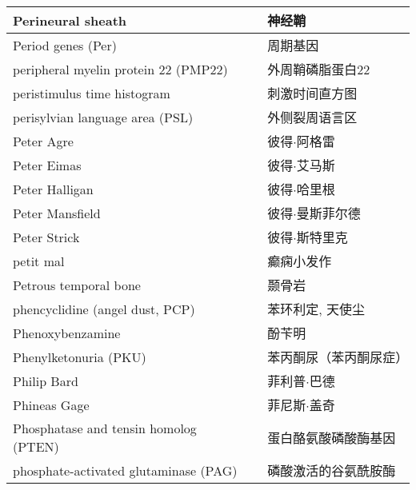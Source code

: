 \begin{longtable}{lll}
	\midrule
	Perineural sheath     && 神经鞘   \\
	
	\midrule
	Period genes (Per)    && 周期基因   \\
	
	\midrule
	peripheral myelin protein 22  (PMP22)   && 外周鞘磷脂蛋白22   \\
	
	\midrule
	peristimulus time histogram   && 刺激时间直方图   \\
	
	\midrule
	perisylvian language area (PSL)   && 外侧裂周语言区   \\
	
	\midrule
	Peter Agre     && 彼得$\cdot$阿格雷   \\
	
	\midrule
	Peter Eimas     && 彼得$\cdot$艾马斯   \\
	
	\midrule
	Peter Halligan     && 彼得$\cdot$哈里根   \\
	
	\midrule
	Peter Mansfield     && 彼得$\cdot$曼斯菲尔德   \\
	
	\midrule
	Peter Strick     && 彼得$\cdot$斯特里克   \\
	
	\midrule
	petit mal     && 癫痫小发作   \\
	
	\midrule
	Petrous temporal bone     && 颞骨岩   \\
	
	\midrule
	phencyclidine  (angel dust, PCP)  &&  苯环利定, 天使尘   \\
	
	\midrule
	Phenoxybenzamine  &&  酚苄明   \\
	
	\midrule
	Phenylketonuria (PKU)    &&  苯丙酮尿（苯丙酮尿症）   \\
	
	\midrule
	Philip Bard     && 菲利普$\cdot$巴德   \\
	
	\midrule
	Phineas Gage     && 菲尼斯$\cdot$盖奇   \\
	
	\midrule
	Phosphatase and tensin homolog (PTEN)    && 蛋白酪氨酸磷酸酶基因   \\
	
	\midrule
	phosphate-activated glutaminase (PAG)   && 磷酸激活的谷氨酰胺酶   \\
	

\end{longtable}
